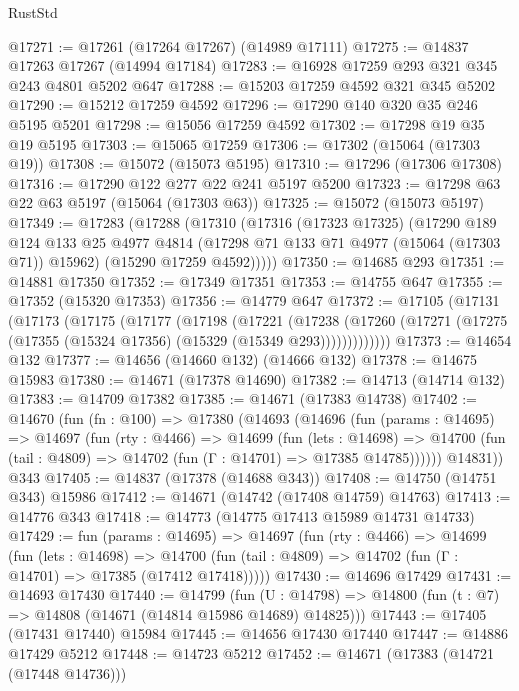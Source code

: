 \begin{lexlean}{RustStd}
\begin{coremodule}
@17271 := @17261 (@17264 @17267) (@14989 @17111)
@17275 := @14837 @17263 @17267 (@14994 @17184)
@17283 := @16928 @17259 @293 @321 @345 @243 @4801 @5202 @647
@17288 := @15203 @17259 @4592 @321 @345 @5202
@17290 := @15212 @17259 @4592
@17296 := @17290 @140 @320 @35 @246 @5195 @5201
@17298 := @15056 @17259 @4592
@17302 := @17298 @19 @35 @19 @5195
@17303 := @15065 @17259
@17306 := @17302 (@15064 (@17303 @19))
@17308 := @15072 (@15073 @5195)
@17310 := @17296 (@17306 @17308)
@17316 := @17290 @122 @277 @22 @241 @5197 @5200
@17323 := @17298 @63 @22 @63 @5197 (@15064 (@17303 @63))
@17325 := @15072 (@15073 @5197)
@17349 := @17283
    (@17288
      (@17310
        (@17316
          (@17323 @17325)
          (@17290
            @189
            @124
            @133
            @25
            @4977
            @4814
            (@17298 @71 @133 @71 @4977 (@15064 (@17303 @71)) @15962)
            (@15290 @17259 @4592)))))
@17350 := @14685 @293
@17351 := @14881 @17350
@17352 := @17349 @17351
@17353 := @14755 @647
@17355 := @17352 (@15320 @17353)
@17356 := @14779 @647
@17372 := @17105
    (@17131
      (@17173
        (@17175
          (@17177
            (@17198
              (@17221
                (@17238
                  (@17260 (@17271 (@17275 (@17355 (@15324 @17356) (@15329 (@15349 @293)))))))))))))
@17373 := @14654 @132
@17377 := @14656 (@14660 @132) (@14666 @132)
@17378 := @14675 @15983
@17380 := @14671 (@17378 @14690)
@17382 := @14713 (@14714 @132)
@17383 := @14709 @17382
@17385 := @14671 (@17383 @14738)
@17402 := @14670
    (fun (fn : @100) =>
    @17380
      (@14693
        (@14696
          (fun (params : @14695) =>
          @14697
            (fun (rty : @4466) =>
            @14699
              (fun (lets : @14698) =>
              @14700 (fun (tail : @4809) => @14702 (fun (Γ : @14701) => @17385 @14785))))))
        @14831))
    @343
@17405 := @14837 (@17378 (@14688 @343))
@17408 := @14750 (@14751 @343) @15986
@17412 := @14671 (@14742 (@17408 @14759) @14763)
@17413 := @14776 @343
@17418 := @14773 (@14775 @17413 @15989 @14731 @14733)
@17429 := fun (params : @14695) =>
  @14697
    (fun (rty : @4466) =>
    @14699
      (fun (lets : @14698) =>
      @14700 (fun (tail : @4809) => @14702 (fun (Γ : @14701) => @17385 (@17412 @17418)))))
@17430 := @14696 @17429
@17431 := @14693 @17430
@17440 := @14799
    (fun (U : @14798) => @14800 (fun (t : @7) => @14808 (@14671 (@14814 @15986 @14689) @14825)))
@17443 := @17405 (@17431 @17440) @15984
@17445 := @14656 @17430 @17440
@17447 := @14886 @17429 @5212
@17448 := @14723 @5212
@17452 := @14671 (@17383 (@14721 (@17448 @14736)))

\end{coremodule}
\end{lexlean}
